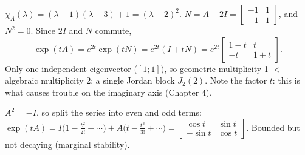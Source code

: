 \begin{workbox}[title={Worked example: $A=\begin{bmatrix}1&1\\-1&3\end{bmatrix}$ (repeated eigenvalue, not diagonalisable)}]
$\chi_A(\lambda)=(\lambda-1)(\lambda-3)+1=(\lambda-2)^2$. $N=A-2I=\begin{bmatrix}-1&1\\-1&1\end{bmatrix}$, and $N^2=0$. Since $2I$ and $N$ commute,
\[\exp(tA)=e^{2t}\exp(tN)=e^{2t}(I+tN)=e^{2t}\begin{bmatrix}1-t&t\\-t&1+t\end{bmatrix}.\]
Only one independent eigenvector ($[1;1]$), so geometric multiplicity 1 $<$ algebraic multiplicity 2: a single Jordan block $J_2(2)$. Note the factor $t$: this is what causes trouble on the imaginary axis (Chapter 4).
\end{workbox}

\begin{workbox}[title={Worked example: $A=\begin{bmatrix}0&1\\-1&0\end{bmatrix}$ (eigenvalues $\pm i$)}]
$A^2=-I$, so split the series into even and odd terms:
$\exp(tA)=I\big(1-\frac{t^2}{2!}+\cdots\big)+A\big(t-\frac{t^3}{3!}+\cdots\big)=\begin{bmatrix}\cos t&\sin t\\-\sin t&\cos t\end{bmatrix}$. Bounded but not decaying (marginal stability).
\end{workbox}

